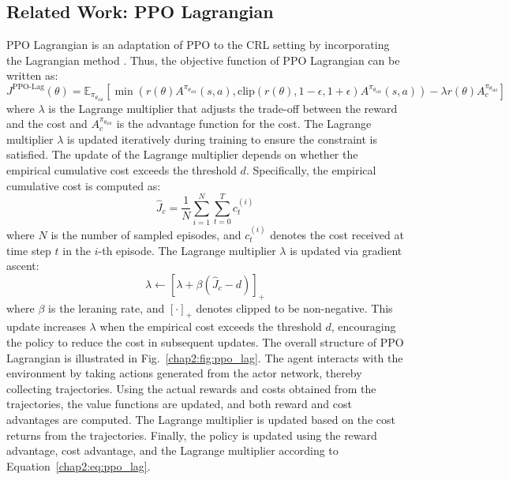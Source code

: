 \subsection{Related Work: PPO Lagrangian}

PPO Lagrangian is an adaptation of PPO to the CRL setting by incorporating the Lagrangian method \cite{PPO-Lagrangian}.
Thus, the objective function of PPO Lagrangian can be written as:
\begin{equation} \label{chap2:eq:ppo_lag}
  J^{\text{PPO-Lag}}(\theta) = \mathbb{E}_{\pi_{\theta_\text{old}}} \left[ \min \left( r(\theta) A^{\pi_{\theta_\text{old}}}(s, a), \text{clip}(r(\theta), 1 - \epsilon, 1 + \epsilon)A^{\pi_{\theta_\text{old}}}(s, a) \right) - \lambda r(\theta) A^{\pi_{\theta_\text{old}}}_c \right]
\end{equation}
where $\lambda$ is the Lagrange multiplier that adjusts the trade-off between the reward and the cost and  $A^{\pi_{\theta_\text{old}}}_c$ is the advantage function for the cost.
The Lagrange multiplier $\lambda$ is updated iteratively during training to ensure the constraint is satisfied.
The update of the Lagrange multiplier depends on whether the empirical cumulative cost exceeds the threshold $d$.
Specifically, the empirical cumulative cost is computed as:
\begin{equation}
  \hat{J}_c = \frac{1}{N} \sum^N_{i = 1} \sum^T_{t = 0}  c^{(i)}_t
\end{equation}
where $N$ is the number of sampled episodes, and $c^{(i)}_t$ denotes the cost received at time step $t$ in the $i$-th episode.
The Lagrange multiplier $\lambda$ is updated via gradient ascent:
\begin{equation}
  \lambda \leftarrow \left[ \lambda + \beta\left( \hat{J}_c - d \right) \right]_+
\end{equation}
where $\beta$ is the leraning rate, and $[\cdot]_+$ denotes clipped to be non-negative.
This update increases $\lambda$ when the empirical cost exceeds the threshold $d$, encouraging the policy to reduce the cost in subsequent updates.
The overall structure of PPO Lagrangian is illustrated in Fig.~\ref{chap2:fig:ppo_lag}.
The agent interacts with the environment by taking actions generated from the actor network, thereby collecting trajectories. 
Using the actual rewards and costs obtained from the trajectories, the value functions are updated, and both reward and cost advantages are computed. 
The Lagrange multiplier is updated based on the cost returns from the trajectories. 
Finally, the policy is updated using the reward advantage, cost advantage, and the Lagrange multiplier according to Equation~\ref{chap2:eq:ppo_lag}.

